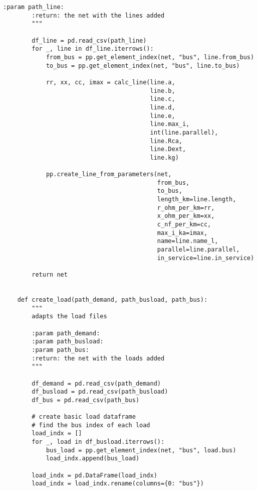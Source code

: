 \begin{lstlisting}[caption={Main code in Python with the Pandapower library}]
        :param path_line:
        :return: the net with the lines added
        """

        df_line = pd.read_csv(path_line)
        for _, line in df_line.iterrows():
            from_bus = pp.get_element_index(net, "bus", line.from_bus)
            to_bus = pp.get_element_index(net, "bus", line.to_bus)

            rr, xx, cc, imax = calc_line(line.a,
                                         line.b,
                                         line.c,
                                         line.d,
                                         line.e,
                                         line.max_i,
                                         int(line.parallel),
                                         line.Rca,
                                         line.Dext,
                                         line.kg)

            pp.create_line_from_parameters(net,
                                           from_bus,
                                           to_bus,
                                           length_km=line.length,
                                           r_ohm_per_km=rr,
                                           x_ohm_per_km=xx,
                                           c_nf_per_km=cc,
                                           max_i_ka=imax,
                                           name=line.name_l,
                                           parallel=line.parallel,
                                           in_service=line.in_service)

        return net


    def create_load(path_demand, path_busload, path_bus):
        """
        adapts the load files

        :param path_demand:
        :param path_busload:
        :param path_bus:
        :return: the net with the loads added
        """

        df_demand = pd.read_csv(path_demand)
        df_busload = pd.read_csv(path_busload)
        df_bus = pd.read_csv(path_bus)

        # create basic load dataframe
        # find the bus index of each load
        load_indx = []
        for _, load in df_busload.iterrows():
            bus_load = pp.get_element_index(net, "bus", load.bus)
            load_indx.append(bus_load)

        load_indx = pd.DataFrame(load_indx)
        load_indx = load_indx.rename(columns={0: "bus"})


\end{lstlisting}
